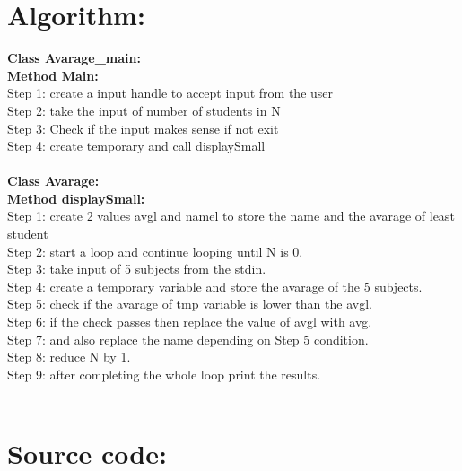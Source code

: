 \section*{Algorithm:}
\textbf{\color{javapurple}Class Avarage\_main:}\\
\textbf{Method Main:}\\
Step 1: create a input handle to accept input from the user\\
Step 2: take the input of number of students in N \\
Step 3: Check if the input makes sense if not exit \\
Step 4: create temporary and call displaySmall\\\\
\textbf{\color{javapurple}Class Avarage:}\\
\textbf{Method displaySmall:}\\
Step 1: create 2 values avgl and namel to store the name and the avarage of least student\\
Step 2: start a loop and continue looping until N is 0.\\
Step 3: take input of 5 subjects from the stdin.\\
Step 4: create a temporary variable and store the avarage of the 5 subjects.\\
Step 5: check if the avarage of tmp variable is lower than the avgl.\\
Step 6: if the check passes then replace the value of avgl with avg. \\
Step 7: and also replace the name depending on Step 5 condition. \\
Step 8: reduce N by 1.\\
Step 9: after completing the whole loop print the results.\\\\

\section*{Source code:}



